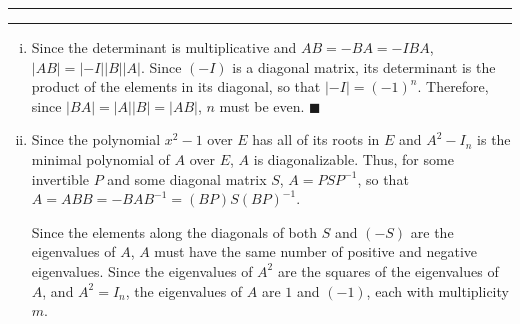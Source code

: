 \documentclass[11pt]{article}
\newcounter{questionCounter}
\newcounter{partCounter}[questionCounter]
\newenvironment{question}[2][\arabic{questionCounter}]{%
    \setcounter{partCounter}{0}%
    \vspace{.25in} \hrule \vspace{0.5em}%
        \noindent{\bf #2}%
    \vspace{0.8em} \hrule \vspace{.10in}%
    \addtocounter{questionCounter}{1}%
}{}
\begin{document}
\begin{question}{Exercise 2}
\begin{enumerate}[i.]
\item Since the determinant is multiplicative and $AB = -BA = -IBA$,
$|AB| = |-I||B||A|$. Since $(-I)$ is a diagonal matrix, its determinant is the
product of the elements in its diagonal, so that $|-I| = (-1)^n$. Therefore,
since $|BA| = |A||B| = |AB|$, $n$ must be even. \qquad $\blacksquare$

\item Since the polynomial $x^2 - 1$ over $E$ has all of its roots in $E$ and
$A^2 - I_n$ is the minimal polynomial of $A$ over $E$, $A$ is diagonalizable.
Thus, for some invertible $P$ and some diagonal matrix $S$, $A = PSP^{-1}$, so
that $A = ABB = -BAB^{-1} = (BP)S(BP)^{-1}$.

Since the elements along the diagonals of both $S$ and $(-S)$ are the
eigenvalues of $A$, $A$ must have the same number of positive and negative
eigenvalues. Since the eigenvalues of $A^2$ are the squares of the eigenvalues
of $A$, and $A^2 = I_n$, the eigenvalues of $A$ are $1$ and $(-1)$, each with
multiplicity $m$.
\end{enumerate}
\end{question}
\newpage
\end{document}
